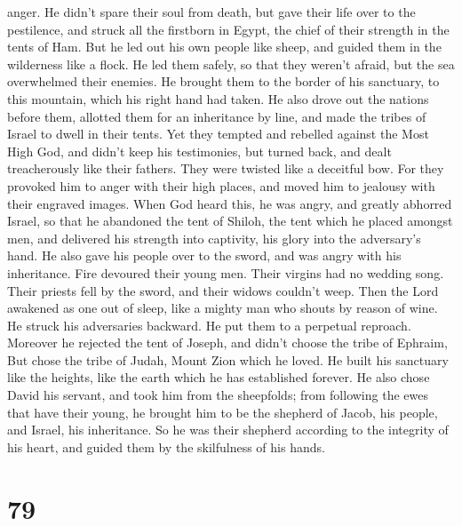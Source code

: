 anger. He didn't spare their soul from death, but gave their life over
to the pestilence,  and struck all the firstborn in
Egypt, the chief of their strength in the tents of Ham. 
But he led out his own people like sheep, and guided them in the
wilderness like a flock.  He led them safely, so that
they weren't afraid, but the sea overwhelmed their enemies.
 He brought them to the border of his sanctuary, to this
mountain, which his right hand had taken.  He also drove
out the nations before them, allotted them for an inheritance by line,
and made the tribes of Israel to dwell in their tents. 
Yet they tempted and rebelled against the Most High God, and didn't keep
his testimonies,  but turned back, and dealt
treacherously like their fathers. They were twisted like a deceitful
bow.  For they provoked him to anger with their high
places, and moved him to jealousy with their engraved images.
 When God heard this, he was angry, and greatly abhorred
Israel,  so that he abandoned the tent of Shiloh, the
tent which he placed amongst men,  and delivered his
strength into captivity, his glory into the adversary's hand.
 He also gave his people over to the sword, and was angry
with his inheritance.  Fire devoured their young men.
Their virgins had no wedding song.  Their priests fell by
the sword, and their widows couldn't weep.  Then the Lord
awakened as one out of sleep, like a mighty man who shouts by reason of
wine.  He struck his adversaries backward. He put them to
a perpetual reproach.  Moreover he rejected the tent of
Joseph, and didn't choose the tribe of Ephraim,  But
chose the tribe of Judah, Mount Zion which he loved.  He
built his sanctuary like the heights, like the earth which he has
established forever.  He also chose David his servant,
and took him from the sheepfolds;  from following the
ewes that have their young, he brought him to be the shepherd of Jacob,
his people, and Israel, his inheritance.  So he was their
shepherd according to the integrity of his heart, and guided them by the
skilfulness of his hands.

\hypertarget{section-78}{%
\section{79}\label{section-78}}


